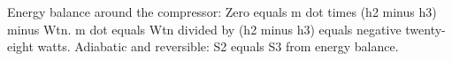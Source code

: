 Energy balance around the compressor:
Zero equals m dot times (h2 minus h3) minus Wtn.
m dot equals Wtn divided by (h2 minus h3) equals negative twenty-eight watts.
Adiabatic and reversible: S2 equals S3 from energy balance.